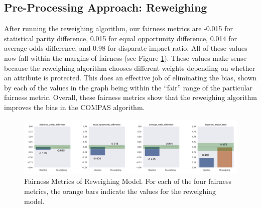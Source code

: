 \documentclass[water,article,submit,moreauthors,pdftex]{mdpi}
\begin{document}
\hypertarget{pre-processing-approach-reweighing}{%
\subsection{Pre-Processing Approach:
Reweighing}\label{pre-processing-approach-reweighing}}

After running the reweighing algorithm, our fairness metrics are -0.015
for statistical parity difference, 0.015 for equal opportunity
difference, 0.014 for average odds difference, and 0.98 for disparate
impact ratio. All of these values now fall within the margins of
fairness (see Figure \ref{fig:reweighing metrics}). These values make
sense because the reweighing algorithm chooses different weights
depending on whether an attribute is protected. This does an effective
job of eliminating the bias, shown by each of the values in the graph
being within the ``fair'' range of the particular fairness metric.
Overall, these fairness metrics show that the reweighing algorithm
improves the bias in the COMPAS algorithm.

\begin{figure}

{\centering \includegraphics[width=1\linewidth]{../images/reweighting_metrics} 

}

\caption{Fairness Metrics of Reweighing Model. For each of the four fairness metrics, the orange bars indicate the values for the reweighing model.}\label{fig:reweighing metrics}
\end{figure}
\end{document}
